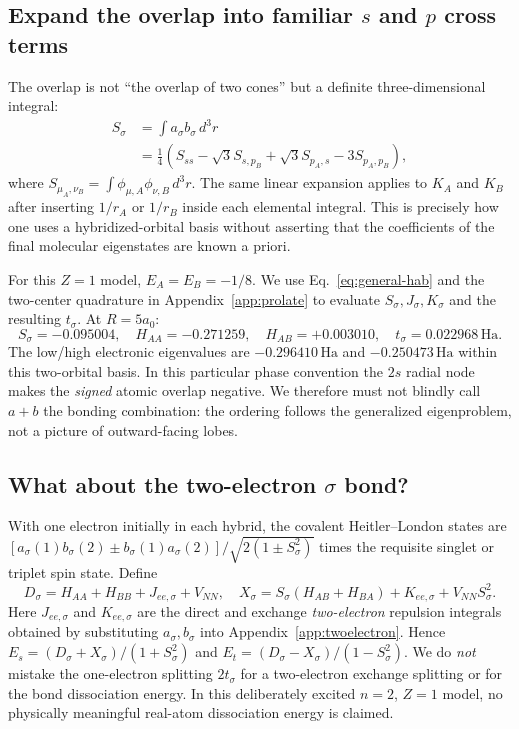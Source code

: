 \documentclass[11pt,letterpaper]{article}
\newcommand{\ha}{\,\mathrm{Ha}}
\begin{document}
\subsection{Expand the overlap into familiar $s$ and $p$ cross terms}
The overlap is not ``the overlap of two cones'' but a definite three-dimensional integral:
\begin{equation}\label{eq:sigma-overlap}
\begin{aligned}
S_\sigma&=\int a_\sigma b_\sigma\,d^3r\\
&=\frac14\left(S_{ss}-\sqrt3 S_{s,p_B}+\sqrt3 S_{p_A,s}-3S_{p_A,p_B}\right),
\end{aligned}
\end{equation}
where $S_{\mu_A,\nu_B}=\int\phi_{\mu,A}\phi_{\nu,B}\,d^3r$. The same linear expansion applies to $K_A$ and $K_B$ after inserting $1/r_A$ or $1/r_B$ inside each elemental integral. This is precisely how one uses a hybridized-orbital basis without asserting that the coefficients of the final molecular eigenstates are known a priori.

For this $Z=1$ model, $E_A=E_B=-1/8$. We use Eq.~\eqref{eq:general-hab} and the two-center quadrature in Appendix~\ref{app:prolate} to evaluate $S_\sigma,J_\sigma,K_\sigma$ and the resulting $t_\sigma$. At $R=5a_0$:
\begin{equation}\label{eq:sigma-number}
\boxed{S_\sigma=-0.095004,\quad H_{AA}=-0.271259,\quad H_{AB}=+0.003010,\quad t_\sigma=0.022968\ha.}
\end{equation}
The low/high electronic eigenvalues are $-0.296410\ha$ and $-0.250473\ha$ within this two-orbital basis. In this particular phase convention the $2s$ radial node makes the \emph{signed} atomic overlap negative. We therefore must not blindly call $a+b$ the bonding combination: the ordering follows the generalized eigenproblem, not a picture of outward-facing lobes.

\subsection{What about the two-electron $\sigma$ bond?}
With one electron initially in each hybrid, the covalent Heitler--London states are $[a_\sigma(1)b_\sigma(2)\pm b_\sigma(1)a_\sigma(2)]/\sqrt{2(1\pm S_\sigma^2)}$ times the requisite singlet or triplet spin state. Define
\begin{equation}
D_\sigma=H_{AA}+H_{BB}+J_{ee,\sigma}+V_{NN},\quad
X_\sigma=S_\sigma(H_{AB}+H_{BA})+K_{ee,\sigma}+V_{NN}S_\sigma^2.
\end{equation}
Here $J_{ee,\sigma}$ and $K_{ee,\sigma}$ are the direct and exchange \emph{two-electron} repulsion integrals obtained by substituting $a_\sigma,b_\sigma$ into Appendix~\ref{app:twoelectron}. Hence $E_s=(D_\sigma+X_\sigma)/(1+S_\sigma^2)$ and $E_t=(D_\sigma-X_\sigma)/(1-S_\sigma^2)$. We do \emph{not} mistake the one-electron splitting $2t_\sigma$ for a two-electron exchange splitting or for the bond dissociation energy. In this deliberately excited $n=2$, $Z=1$ model, no physically meaningful real-atom dissociation energy is claimed.
\FloatBarrier
\end{document}
